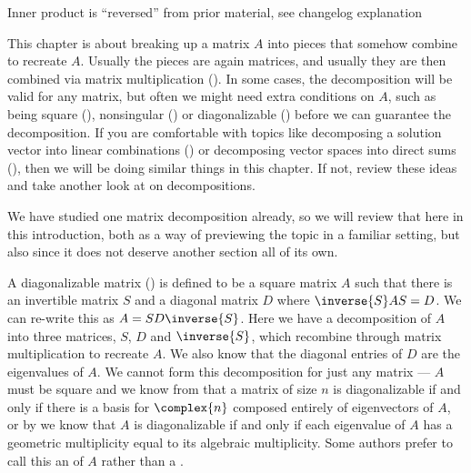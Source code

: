 %
{\sc\large Inner product is ``reversed'' from prior material, see changelog explanation}
\par\medskip
This chapter is about breaking up a matrix $A$ into pieces that somehow combine to recreate $A$.  Usually the pieces are again matrices, and usually they are then combined via matrix multiplication ().  In some cases, the decomposition will be valid for any matrix, but often we might need extra conditions on $A$, such as being square (), nonsingular () or diagonalizable () before we can guarantee the decomposition.  If you are comfortable with topics like decomposing a solution vector into linear combinations () or decomposing vector spaces into direct sums (), then we will be doing similar things in this chapter.  If not, review these ideas and take another look at  on decompositions.\par
%
We have studied one matrix decomposition already, so we will review that here in this introduction, both as a way of previewing the topic in a familiar setting, but also since it does not deserve another section all of its own.\par
%
A diagonalizable matrix () is defined to be a square matrix $A$ such that there is an invertible matrix $S$ and a diagonal matrix $D$ where $\inverse{S}AS=D$.  We can re-write this as $A=SD\inverse{S}$.   Here we have a decomposition of $A$ into three matrices, $S$, $D$ and $\inverse{S}$, which recombine through matrix multiplication to recreate $A$.  We also know that the diagonal entries of $D$ are the eigenvalues of $A$.  We cannot form this decomposition for just any matrix --- $A$ must be square and we know from  that a matrix of size $n$ is diagonalizable if and only if there is a basis for $\complex{n}$ composed entirely of eigenvectors of $A$, or by  we know that $A$ is diagonalizable if and only if each eigenvalue of $A$ has a geometric multiplicity equal to its algebraic multiplicity.  Some authors prefer to call this an  of $A$ rather than a .\par
